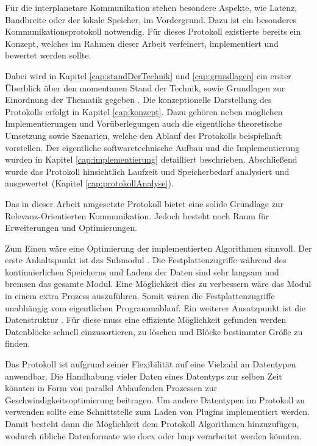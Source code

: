 Für die interplanetare Kommunikation stehen besondere Aspekte, wie Latenz,
Bandbreite oder der lokale Speicher, im Vordergrund. Dazu ist ein besonderes
Kommunikationsprotokoll notwendig. Für dieses Protokoll  existierte
bereits ein Konzept, welches im Rahmen dieser Arbeit verfeinert, implementiert
und bewertet werden sollte.

Dabei wird in Kapitel \ref{cap:standDerTechnik} und \ref{cap:grundlagen} ein
erster Überblick über den momentanen Stand der Technik, sowie Grundlagen zur
Einordnung der Thematik gegeben 
.
Die konzeptionelle Darstellung des Protokolls erfolgt in Kapitel
\ref{cap:konzept}. Dazu gehören neben möglichen Implementierungen und
Vorüberlegungen auch die eigentliche theoretische Umsetzung sowie Szenarien,
welche den Ablauf des Protokolls beispielhaft vorstellen. Der eigentliche
softwaretechnische Aufbau und die Implementierung wurden in Kapitel
\ref{cap:implementierung} detailliert beschrieben. Abschließend wurde das
Protokoll hinsichtlich Laufzeit und Speicherbedarf analysiert und ausgewertet
(Kapitel \ref{cap:protokollAnalyse}). 

Das in dieser Arbeit umgesetzte Protokoll bietet eine solide
Grundlage zur Relevanz-Orientierten Kommunikation. Jedoch besteht noch Raum
für Erweiterungen und Optimierungen.

Zum Einen wäre eine Optimierung der implementierten Algorithmen sinnvoll.
Der erste Anhaltspunkt ist das Submodul .
Die Festplattenzugriffe während des kontinuierlichen Speicherns und Ladens der Daten
sind sehr langsam und bremsen das gesamte Modul. Eine Möglichkeit dies zu
verbessern wäre das Modul in einem extra Prozess auszuf{\"u}hren. Somit wären
die Festplattenzugriffe unabhängig vom eigentlichen Programmablauf. Ein
weiterer Ansatzpunkt ist die Datenstruktur . Für diese muss
eine effiziente Möglichkeit gefunden werden Datenblöcke schnell
einzusortieren, zu löschen und Bl{\"o}cke bestimmter Größe zu finden.

Das Protokoll ist aufgrund seiner Flexibilität auf eine Vielzahl an Datentypen
anwendbar. Die Handhabung vieler Daten eines Datentyps zur selben Zeit könnten
in Form von parallel Ablaufenden Prozessen zur Geschwindigkeitsoptimierung
beitragen. Um andere Datentypen im Protokoll zu verwenden sollte eine
Schnittstelle zum Laden von Plugins implementiert werden. Damit besteht dann die
Möglichkeit dem Protokoll Algorithmen hinzuzufügen, wodurch
übliche Datenformate wie docx oder bmp verarbeitet werden k{\"o}nnten.

